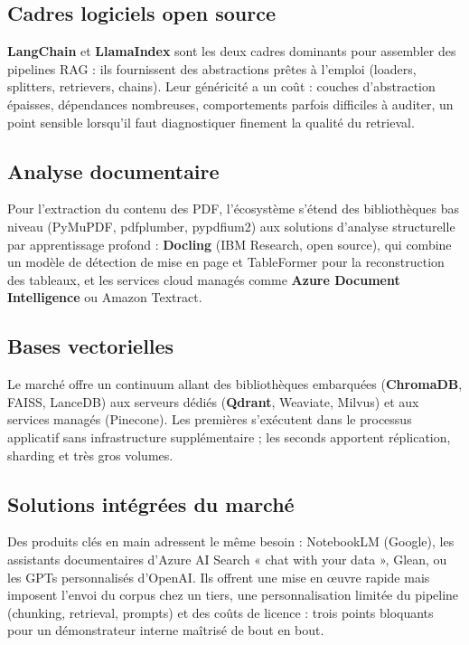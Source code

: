 \subsection{Cadres logiciels open source}
\textbf{LangChain} et \textbf{LlamaIndex} sont les deux cadres dominants pour assembler
des pipelines RAG : ils fournissent des abstractions prêtes à l'emploi (loaders, splitters,
retrievers, chains). Leur généricité a un coût : couches d'abstraction épaisses, dépendances
nombreuses, comportements parfois difficiles à auditer, un point sensible lorsqu'il faut
diagnostiquer finement la qualité du retrieval.

\subsection{Analyse documentaire}
Pour l'extraction du contenu des PDF, l'écosystème s'étend des bibliothèques bas niveau
(PyMuPDF, pdfplumber, pypdfium2) aux solutions d'analyse structurelle par apprentissage
profond : \textbf{Docling} \cite{docling2024} (IBM Research, open source), qui combine un
modèle de détection de mise en page et TableFormer pour la reconstruction des tableaux, et
les services cloud managés comme \textbf{Azure Document Intelligence} ou Amazon Textract.

\subsection{Bases vectorielles}
Le marché offre un continuum allant des bibliothèques embarquées (\textbf{ChromaDB},
FAISS, LanceDB) aux serveurs dédiés (\textbf{Qdrant}, Weaviate, Milvus) et aux services
managés (Pinecone). Les premières s'exécutent dans le processus applicatif sans
infrastructure supplémentaire ; les seconds apportent réplication, sharding et très gros
volumes.

\subsection{Solutions intégrées du marché}
Des produits clés en main adressent le même besoin : NotebookLM (Google), les assistants
documentaires d'Azure AI Search « chat with your data », Glean, ou les GPTs personnalisés
d'OpenAI. Ils offrent une mise en œuvre rapide mais imposent l'envoi du corpus chez un
tiers, une personnalisation limitée du pipeline (chunking, retrieval, prompts) et des coûts
de licence : trois points bloquants pour un démonstrateur interne maîtrisé de bout en bout.

